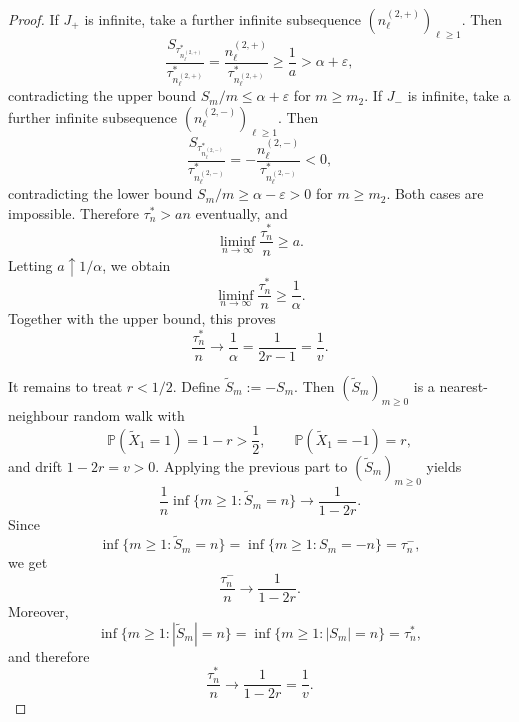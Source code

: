 \documentclass[10pt,a4paper]{amsart}
\begin{document}
\begin{proof}
If \(J_+\) is infinite, take a further infinite subsequence
\((n_\ell^{(2,+)})_{\ell\ge1}\). Then
\[
  \frac{S_{\tau_{n_\ell^{(2,+)}}^*}}{\tau_{n_\ell^{(2,+)}}^*}
  =
  \frac{n_\ell^{(2,+)}}{\tau_{n_\ell^{(2,+)}}^*}
  \ge
  \frac1a
  >
  \alpha+\varepsilon,
\]
contradicting the upper bound \(S_m/m\le\alpha+\varepsilon\) for \(m\ge m_2\).
If \(J_-\) is infinite, take a further infinite subsequence
\((n_\ell^{(2,-)})_{\ell\ge1}\). Then
\[
  \frac{S_{\tau_{n_\ell^{(2,-)}}^*}}{\tau_{n_\ell^{(2,-)}}^*}
  =
  -\frac{n_\ell^{(2,-)}}{\tau_{n_\ell^{(2,-)}}^*}
  <0,
\]
contradicting the lower bound \(S_m/m\ge\alpha-\varepsilon>0\) for
\(m\ge m_2\). Both cases are impossible. Therefore \(\tau_n^*>an\)
eventually, and
\[
  \liminf_{n\to\infty}\frac{\tau_n^*}{n}\ge a.
\]
Letting \(a\uparrow1/\alpha\), we obtain
\[
  \liminf_{n\to\infty}\frac{\tau_n^*}{n}
  \ge
  \frac1\alpha.
\]
Together with the upper bound, this proves
\[
  \frac{\tau_n^*}{n}
  \longrightarrow
  \frac1\alpha
  =
  \frac1{2r-1}
  =
  \frac1v .
\]

It remains to treat \(r<1/2\). Define \(\widetilde S_m:=-S_m\). Then
\((\widetilde S_m)_{m\ge0}\) is a nearest-neighbour random walk with
\[
  \mathbb P(\widetilde X_1=1)=1-r>\frac12,
  \qquad
  \mathbb P(\widetilde X_1=-1)=r,
\]
and drift \(1-2r=v>0\). Applying the previous part to
\((\widetilde S_m)_{m\ge0}\) yields
\[
  \frac1n\inf\{m\ge1:\widetilde S_m=n\}
  \longrightarrow
  \frac1{1-2r}.
\]
Since
\[
  \inf\{m\ge1:\widetilde S_m=n\}
  =
  \inf\{m\ge1:S_m=-n\}
  =
  \tau_n^-,
\]
we get
\[
  \frac{\tau_n^-}{n}
  \longrightarrow
  \frac1{1-2r}.
\]
Moreover,
\[
  \inf\{m\ge1:|\widetilde S_m|=n\}
  =
  \inf\{m\ge1:|S_m|=n\}
  =
  \tau_n^*,
\]
and therefore
\[
  \frac{\tau_n^*}{n}
  \longrightarrow
  \frac1{1-2r}
  =
  \frac1v .
\]
\end{proof}
\end{document}
